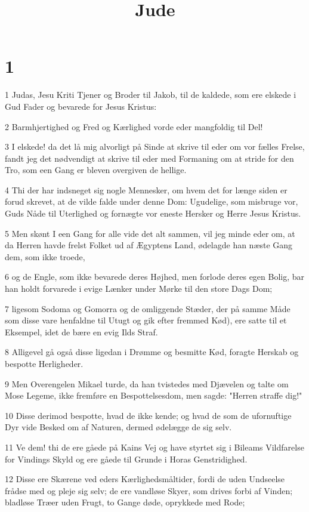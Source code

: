 

\title{Jude}


\chapter{1}

\par 1 Judas, Jesu Kriti Tjener og Broder til Jakob, til de kaldede, som ere elskede i Gud Fader og bevarede for Jesus Kristus:
\par 2 Barmhjertighed og Fred og Kærlighed vorde eder mangfoldig til Del!
\par 3 I elskede! da det lå mig alvorligt på Sinde at skrive til eder om vor fælles Frelse, fandt jeg det nødvendigt at skrive til eder med Formaning om at stride for den Tro, som een Gang er bleven overgiven de hellige.
\par 4 Thi der har indsneget sig nogle Mennesker, om hvem det for længe siden er forud skrevet, at de vilde falde under denne Dom: Ugudelige, som misbruge vor, Guds Nåde til Uterlighed og fornægte vor eneste Hersker og Herre Jesus Kristus.
\par 5 Men skønt I een Gang for alle vide det alt sammen, vil jeg minde eder om, at da Herren havde frelst Folket ud af Ægyptens Land, ødelagde han næste Gang dem, som ikke troede,
\par 6 og de Engle, som ikke bevarede deres Højhed, men forlode deres egen Bolig, bar han holdt forvarede i evige Lænker under Mørke til den store Dags Dom;
\par 7 ligesom Sodoma og Gomorra og de omliggende Stæder, der på samme Måde som disse vare henfaldne til Utugt og gik efter fremmed Kød), ere satte til et Eksempel, idet de bære en evig Ilds Straf.
\par 8 Alligevel gå også disse ligedan i Drømme og besmitte Kød, foragte Herskab og bespotte Herligheder.
\par 9 Men Overengelen Mikael turde, da han tvistedes med Djævelen og talte om Mose Legeme, ikke fremføre en Bespottelsesdom, men sagde: "Herren straffe dig!"
\par 10 Disse derimod bespotte, hvad de ikke kende; og hvad de som de ufornuftige Dyr vide Besked om af Naturen, dermed ødelægge de sig selv.
\par 11 Ve dem! thi de ere gåede på Kains Vej og have styrtet sig i Bileams Vildfarelse for Vindings Skyld og ere gåede til Grunde i Horas Genstridighed.
\par 12 Disse ere Skærene ved eders Kærlighedsmåltider, fordi de uden Undseelse frådse med og pleje sig selv; de ere vandløse Skyer, som drives forbi af Vinden; bladløse Træer uden Frugt, to Gange døde, oprykkede med Rode;
